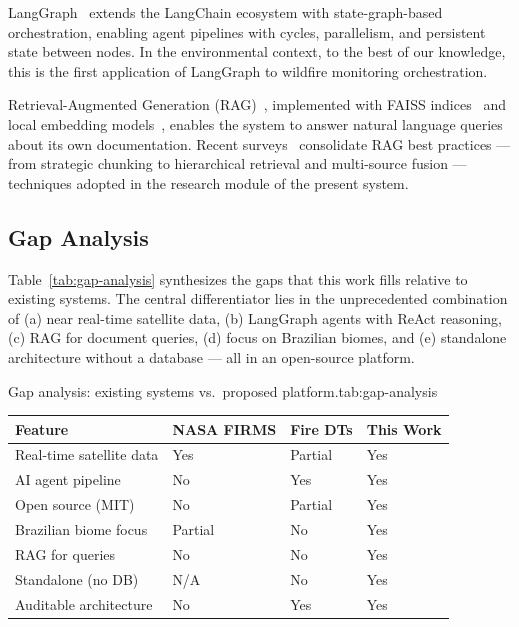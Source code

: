 \documentclass[preprint,12pt,times,numbers]{elsarticle}
\begin{document}
LangGraph~\cite{manual:langgraph2024} extends the LangChain ecosystem with state-graph-based orchestration, enabling agent pipelines with cycles, parallelism, and persistent state between nodes. In the environmental context, to the best of our knowledge, this is the first application of LangGraph to wildfire monitoring orchestration.

Retrieval-Augmented Generation (RAG)~\cite{article:lewis2020}, implemented with FAISS indices~\cite{article:faiss2017} and local embedding models~\cite{model:bge2024}, enables the system to answer natural language queries about its own documentation. Recent surveys~\cite{article:gao2024rag} consolidate RAG best practices --- from strategic chunking to hierarchical retrieval and multi-source fusion --- techniques adopted in the research module of the present system.

\subsection{Gap Analysis}

Table~\ref{tab:gap-analysis} synthesizes the gaps that this work fills relative to existing systems. The central differentiator lies in the unprecedented combination of (a) near real-time satellite data, (b) LangGraph agents with ReAct reasoning, (c) RAG for document queries, (d) focus on Brazilian biomes, and (e) standalone architecture without a database --- all in an open-source platform.

\begin{resulttable}{Gap analysis: existing systems vs.\ proposed platform.}{tab:gap-analysis}
\footnotesize
\begin{tabular}{@{}lp{2.0cm}p{1.6cm}p{1.6cm}@{}}
\toprule
\textbf{Feature} & \textbf{NASA FIRMS} & \textbf{Fire DTs} & \textbf{This Work} \\
\midrule
Real-time satellite data & Yes & Partial & Yes \\
AI agent pipeline & No & Yes & Yes \\
Open source (MIT) & No & Partial & Yes \\
Brazilian biome focus & Partial & No & Yes \\
RAG for queries & No & No & Yes \\
Standalone (no DB) & N/A & No & Yes \\
Auditable architecture & No & Yes & Yes \\
\bottomrule
\end{tabular}
\end{resulttable}
\end{document}
